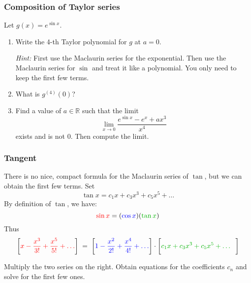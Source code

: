 \documentclass[14pt]{beamer}
\newcommand{\R}{\mathbb{R}}
\newcommand{\p}{\pause}
\newcommand{\azul}[1]{{\color{blue} #1}}
\newcommand{\rojo}[1]{{\color{red} #1}}
\newcommand{\verde}[1]{{\color{verde} #1}}
\newcommand{\setsize}[1]{\fontsize{#1}{#1}\selectfont} %
\newcommand{\smallerfont}{\setsize{13}} %
\newcommand{\vvv}{\vspace{.2cm}}
\begin{document}
	\begin{frame}[t]
		\smallerfont
		\frametitle{Composition of Taylor series}

		Let ${\displaystyle g(x) = e^{\sin x}}$. \vvv

		\begin{enumerate}
			\item Write the 4-th Taylor polynomial for $g$ at $a=0$. \vvv

				{\setsize{11} \emph{Hint:} First use the Maclaurin series for the exponential. Then use the Maclaurin series for $\sin$ and treat it like a polynomial. You only need to keep the first few terms. }
				\vvv

				\p

			\item What is ${\displaystyle g^{(4)}(0)}$? \vvv

				\p

			\item Find a value of $a \in \R$ such that the limit
				\[
					\lim_{x \to 0}\frac{e^{\sin x}- e^{x} + ax^{3} }{x^{4}}
				\]
				exists and is not 0. Then compute the limit.
		\end{enumerate}
	\end{frame}
	\begin{frame}[t]
		\smallerfont
		\frametitle{Tangent}

		There is no nice, compact formula for the Maclaurin series of $\tan$, but we
		can obtain the first few terms. Set
		\[
			\tan x = c_{1} x + c_{3} x^{3} + c_{5}x^{5} + \ldots
		\]
		By definition of $\tan$, we have:
		\[
			\rojo{\sin x}= ( \azul{\cos x}) ( \verde{\tan x})
		\]
		Thus {\setsize{11} \[\left[ \rojo{ x - \frac{x^{3}}{3!} + \frac{x^{5}}{5!} + \ldots}\right] \; = \; \left[ \azul{1 - \frac{x^{2}}{2!} + \frac{x^{4}}{4!} + \ldots}\right] \cdot \left[ \verde{c_1 x + c_3 x^3 + c_5 x^5 + \ldots}\phantom{\frac{1}{1}}\right]\] }

		Multiply the two series on the right. Obtain equations for the coefficients $c
		_{n}$ and solve for the first few ones.
	\end{frame}
\end{document}
